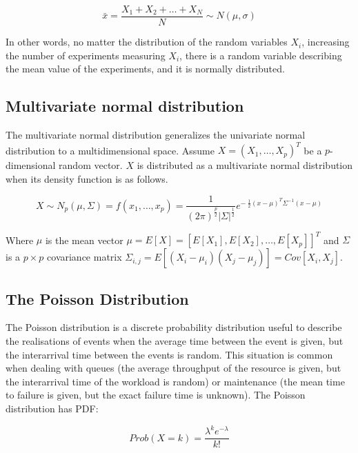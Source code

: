 \begin{equation}
\bar{x}=\frac{X_1+X_2+\ldots+X_N}{N} \sim N(\mu,\sigma)
\label{eq_centralLimitTheorem}
\end{equation}



In other words, no matter the distribution of the random variables $X_i$, increasing the number of experiments measuring $X_i$, there is a random variable describing the mean value of the experiments, and it is normally distributed.

\subsection{Multivariate normal distribution}
The multivariate normal distribution generalizes the univariate normal distribution to a multidimensional space. Assume $X=\left(X_1,\ldots,X_p\right)^T$ be a $p$-dimensional random vector. $X$ is distributed as a multivariate normal distribution when its density function is as follows.

\begin{equation}
X\sim N_p\left(\mu,\Sigma\right)= f\left(x_1,\ldots,x_p\right)=\frac{1}{\left(2\pi\right)^\frac{p}{2}\left|\Sigma\right|^\frac{1}{2}}e^{-\ \frac{1}{2}\left(x-\mu\right)^T\Sigma^{-1}(x-\mu)}
\label{eq_multivariateNormal}
\end{equation}

Where $\mu$ is the mean vector $\mu=E\left[X\right]=\left[E\left[X_1\right],E\left[X_2\right],\ldots,E\left[X_p\right]\right]^T$ and $\Sigma$ is a $p\times p$ covariance matrix $\Sigma_{i,j}=E\left[\left(X_i-\mu_i\right)\left(X_j-\mu_j\right)\right]=Cov[X_i,X_j]$.

\subsection{The Poisson Distribution} \label{secPoisson}
The Poisson distribution is a discrete probability distribution useful to describe the realisations of events when the average time between the event is given, but the interarrival time between the events is random. This situation is common when dealing with queues (the average throughput of the resource is given, but the interarrival time of the workload is random) or maintenance (the mean time to failure is given, but the exact failure time is unknown). The Poisson distribution has PDF:

\begin{equation}
Prob\left(X=k\right)=\frac{\lambda^ke^{-\lambda}}{k!}
\label{eq_poissonPDF}
\end{equation}

